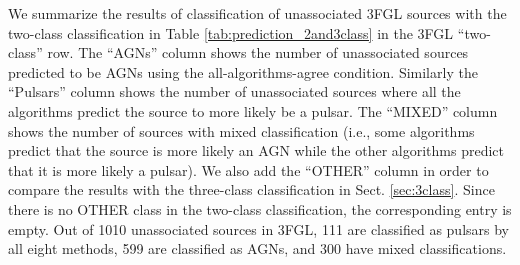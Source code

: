 \documentclass[referee]{aa} %
\begin{document}
\begin{table}[!h]

    \caption{Expected numbers of sources among the unassociated 3FGL and 4FGL-DR2 sources.}
    \label{tab:prediction_2and3class}

\centering
{}
\end{table}

We summarize the results of classification of unassociated 3FGL sources with the two-class classification 
in Table \ref{tab:prediction_2and3class} in the 3FGL ``two-class'' row.
The ``AGNs'' column shows the number of unassociated sources predicted to be AGNs using the all-algorithms-agree condition.
Similarly the ``Pulsars'' column shows the number of unassociated sources where all the algorithms predict the source to more likely be a pulsar.
The ``MIXED'' column shows the number of sources with mixed classification (i.e., some algorithms predict that the source is more likely an AGN while the other algorithms predict that it is more likely a pulsar).
We also add the ``OTHER'' column in order to compare the results with the three-class classification in Sect. \ref{sec:3class}.
Since there is no OTHER class in the two-class classification, the corresponding entry is empty.
Out of 1010 unassociated sources in 3FGL, 111 are classified as pulsars by all eight methods, 599 are classified as AGNs, and 300 have mixed classifications.
\end{document}
